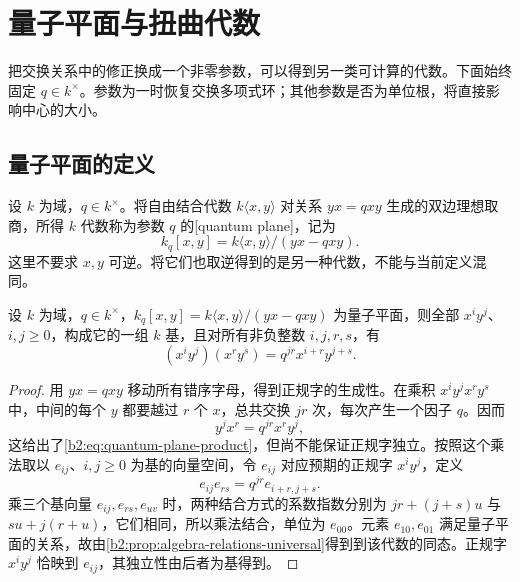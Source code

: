 
\section{量子平面与扭曲代数}
\label{b2:sec:2003}

把交换关系中的修正换成一个非零参数，可以得到另一类可计算的代数。下面始终固定 \(q\in k^\times\)。参数为一时恢复交换多项式环；其他参数是否为单位根，将直接影响中心的大小。

%
%

\subsection{量子平面的定义}
\label{b2:subsec:2003:01}

\begin{definition}\label{b2:def:quantum-plane}
	设 \(k\) 为域，\(q\in k^\times\)。将自由结合代数 \(k\langle x,y\rangle\) 对关系 \(yx=qxy\) 生成的双边理想取商，所得 \(k\) 代数称为参数 \(q\) 的[quantum plane]，记为
	\[
		k_q[x,y]=k\langle x,y\rangle/(yx-qxy).
	\]
	这里不要求 \(x,y\) 可逆。将它们也取逆得到的是另一种代数，不能与当前定义混同。
\end{definition}

\begin{theorem}\label{b2:thm:quantum-plane-normal-basis}
	设 \(k\) 为域，\(q\in k^\times\)，\(k_q[x,y]=k\langle x,y\rangle/(yx-qxy)\) 为量子平面，则全部 \(x^iy^j\)、\(i,j\ge0\)，构成它的一组 \(k\) 基，且对所有非负整数 \(i,j,r,s\)，有
	\begin{equation}\label{b2:eq:quantum-plane-product}
		(x^iy^j)(x^ry^s)=q^{jr}x^{i+r}y^{j+s}.
	\end{equation}
\end{theorem}
\begin{proof}
	用 \(yx=qxy\) 移动所有错序字母，得到正规字的生成性。在乘积 \(x^iy^jx^ry^s\) 中，中间的每个 \(y\) 都要越过 \(r\) 个 \(x\)，总共交换 \(jr\) 次，每次产生一个因子 \(q\)。因而
	\[
		y^jx^r=q^{jr}x^ry^j,
	\]
	这给出了\eqref{b2:eq:quantum-plane-product}，但尚不能保证正规字独立。按照这个乘法取以 \(e_{ij}\)、\(i,j\ge0\) 为基的向量空间，令 \(e_{ij}\) 对应预期的正规字 \(x^iy^j\)，定义
	\[
		e_{ij}e_{rs}=q^{jr}e_{i+r,j+s}.
	\]
	乘三个基向量 \(e_{ij},e_{rs},e_{uv}\) 时，两种结合方式的系数指数分别为 \(jr+(j+s)u\) 与 \(su+j(r+u)\)，它们相同，所以乘法结合，单位为 \(e_{00}\)。元素 \(e_{10},e_{01}\) 满足量子平面的关系，故由\cref{b2:prop:algebra-relations-universal}得到到该代数的同态。正规字 \(x^iy^j\) 恰映到 \(e_{ij}\)，其独立性由后者为基得到。
\end{proof}


